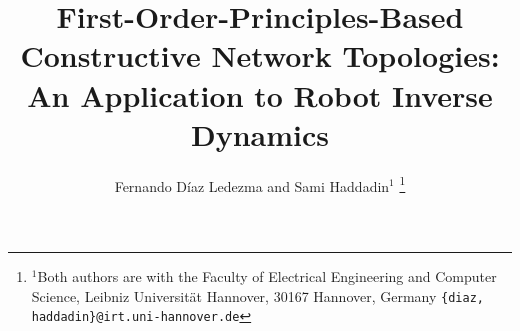 \usepackage[utf8]{inputenc}
\usepackage{amsmath} %
\usepackage{amssymb}  %
\usepackage[english]{babel}
\usepackage{bm}
\usepackage{graphicx}
\usepackage{caption}
\usepackage{multicol}
\usepackage{url}
\usepackage{algorithm}
\usepackage[]{algpseudocode}
\usepackage[T1]{fontenc}
\usepackage[T1]{xcolor}
\usepackage{arydshln}
\usepackage{soul}
\usepackage{subfig}

\usepackage{afterpage}

\newcommand\blankpage{%
    \null
    \thispagestyle{empty}%
    \addtocounter{page}{-1}%
    \newpage}

\usepackage[backend=biber,style=ieee,sorting=none]{biblatex}



\newtheorem{prop}{Proposition}

\title{\LARGE \bf
First-Order-Principles-Based Constructive Network Topologies: An Application to Robot Inverse Dynamics
}


\author{Fernando D\'iaz Ledezma and Sami Haddadin$^{1}$%
\thanks{$^{1}$Both authors are with the Faculty of Electrical Engineering and Computer Science, Leibniz
        Universit\"at Hannover, 30167 Hannover, Germany
        {\tt\small \{diaz, haddadin\}@irt.uni-hannover.de}}%
}



\maketitle

